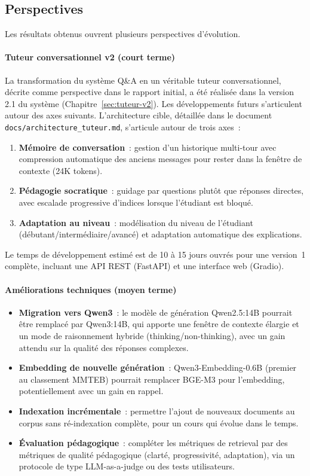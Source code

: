 \documentclass[11pt,a4paper]{article}
\begin{document}
\subsection{Perspectives}

Les résultats obtenus ouvrent plusieurs perspectives d'évolution.

\paragraph{Tuteur conversationnel v2 (court terme)}

La transformation du système Q\&A en un véritable tuteur conversationnel, décrite comme perspective dans le rapport initial, a été réalisée dans la version 2.1 du système (Chapitre~\ref{sec:tuteur-v2}). Les développements futurs s'articulent autour des axes suivants. L'architecture cible, détaillée dans le document \texttt{docs/architecture\_tuteur.md}, s'articule autour de trois axes~:

\begin{enumerate}
  \item \textbf{Mémoire de conversation}~: gestion d'un historique multi-tour avec compression automatique des anciens messages pour rester dans la fenêtre de contexte (24K tokens).
  \item \textbf{Pédagogie socratique}~: guidage par questions plutôt que réponses directes, avec escalade progressive d'indices lorsque l'étudiant est bloqué.
  \item \textbf{Adaptation au niveau}~: modélisation du niveau de l'étudiant (débutant/intermédiaire/avancé) et adaptation automatique des explications.
\end{enumerate}

Le temps de développement estimé est de 10 à 15 jours ouvrés pour une version~1 complète, incluant une API REST (FastAPI) et une interface web (Gradio).

\paragraph{Améliorations techniques (moyen terme)}

\begin{itemize}
  \item \textbf{Migration vers Qwen3}~: le modèle de génération Qwen2.5:14B pourrait être remplacé par Qwen3:14B, qui apporte une fenêtre de contexte élargie et un mode de raisonnement hybride (thinking/non-thinking), avec un gain attendu sur la qualité des réponses complexes.
  \item \textbf{Embedding de nouvelle génération}~: Qwen3-Embedding-0.6B (premier au classement MMTEB) pourrait remplacer BGE-M3 pour l'embedding, potentiellement avec un gain en rappel.
  \item \textbf{Indexation incrémentale}~: permettre l'ajout de nouveaux documents au corpus sans ré-indexation complète, pour un cours qui évolue dans le temps.
  \item \textbf{Évaluation pédagogique}~: compléter les métriques de retrieval par des métriques de qualité pédagogique (clarté, progressivité, adaptation), via un protocole de type LLM-as-a-judge ou des tests utilisateurs.
\end{itemize}
\end{document}

